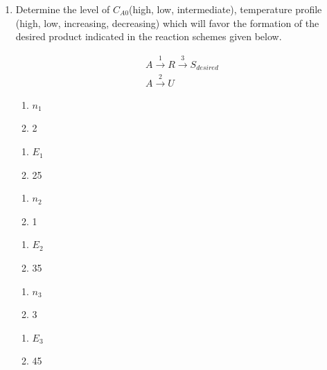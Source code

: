 \documentclass[journal,12pt,onecolumn]{IEEEtran}
\theoremstyle{remark}
\begin{document}
\begin{enumerate}
\begin{multicols}{4}
    \begin{enumerate}
        \item 2432.8
        \item 4865.6
        \item 9731.2
        \item 13183.3
    \end{enumerate}
\end{multicols}

    \item Determine the level of $C_{A0}$(high, low, intermediate), temperature profile (high, low, increasing, decreasing) which will favor the formation of the desired product indicated in the reaction schemes given below.

    \begin{align*}
        A\xrightarrow{1}R\xrightarrow{3}S_{desired} \\
        A\xrightarrow{2}U
    \end{align*}

    \begin{multicols}{6}
        \begin{enumerate}[label =]
            \item $n_1$
            \item 2
        \end{enumerate}
        \columnbreak
        \begin{enumerate}[label =]
            \item $E_1$
            \item 25
        \end{enumerate}
        \columnbreak
    \begin{enumerate}[label =]
        \item $n_2$
        \item 1
    \end{enumerate}
    \columnbreak
    \begin{enumerate}[label =]
        \item $E_2$
        \item 35
    \end{enumerate}
    \columnbreak
    \begin{enumerate}[label =]
        \item $n_3$
        \item 3
    \end{enumerate}
    \columnbreak
    \begin{enumerate}[label =]
        \item $E_3$
        \item 45
    \end{enumerate}
    \end{multicols}


\end{enumerate}
\end{document}
